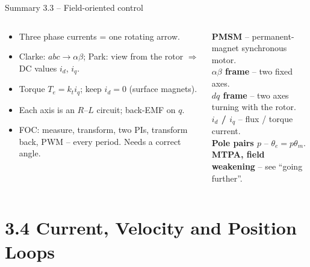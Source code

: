 \documentclass[aspectratio=169,10pt]{beamer}
\begin{document}
\begin{frame}{Summary 3.3 -- Field-oriented control}
\begin{columns}[T,onlytextwidth]
\begin{keybox}
\small
\begin{itemize}
\item Three phase currents = one rotating arrow.
\item Clarke: $abc\to\alpha\beta$; Park: view from the rotor $\Rightarrow$ DC values $i_d$, $i_q$.
\item Torque $T_e=k_ti_q$; keep $i_d=0$ (surface magnets).
\item Each axis is an $R$--$L$ circuit; back-EMF on $q$.
\item FOC: measure, transform, two PIs, transform back, PWM -- every period. Needs a correct angle.
\end{itemize}
\end{keybox}
\begin{defbox}
\small
\textbf{PMSM} -- permanent-magnet synchronous motor.\\
\textbf{$\alpha\beta$ frame} -- two fixed axes.\\
\textbf{$dq$ frame} -- two axes turning with the rotor.\\
\textbf{$i_d$ / $i_q$} -- flux / torque current.\\
\textbf{Pole pairs $p$} -- $\theta_e=p\theta_m$.\\
\textbf{MTPA, field weakening} -- see ``going further''.
\end{defbox}
\end{columns}
\end{frame}

\section{3.4 Current, Velocity and Position Loops}
\end{document}
